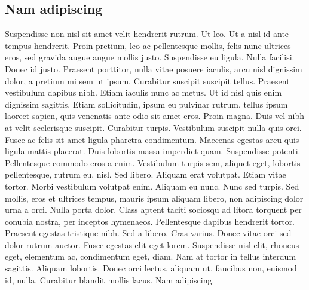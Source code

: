  \subsection{Nam adipiscing}
 Suspendisse non nisl sit amet velit hendrerit rutrum. Ut leo. Ut a nisl id ante tempus hendrerit. Proin pretium, leo ac pellentesque mollis, felis nunc ultrices eros, sed gravida augue augue mollis justo. Suspendisse eu ligula. Nulla facilisi. Donec id justo. Praesent porttitor, nulla vitae posuere iaculis, arcu nisl dignissim dolor, a pretium mi sem ut ipsum. Curabitur suscipit suscipit tellus. Praesent vestibulum dapibus nibh. Etiam iaculis nunc ac metus. Ut id nisl quis enim dignissim sagittis. Etiam sollicitudin, ipsum eu pulvinar rutrum, tellus ipsum laoreet sapien, quis venenatis ante odio sit amet eros. Proin magna. Duis vel nibh at velit scelerisque suscipit. Curabitur turpis. Vestibulum suscipit nulla quis orci. Fusce ac felis sit amet ligula pharetra condimentum. Maecenas egestas arcu quis ligula mattis placerat. Duis lobortis massa imperdiet quam. Suspendisse potenti. Pellentesque commodo eros a enim. Vestibulum turpis sem, aliquet eget, lobortis pellentesque, rutrum eu, nisl. Sed libero. Aliquam erat volutpat. Etiam vitae tortor. Morbi vestibulum volutpat enim. Aliquam eu nunc. Nunc sed turpis. Sed mollis, eros et ultrices tempus, mauris ipsum aliquam libero, non adipiscing dolor urna a orci. Nulla porta dolor. Class aptent taciti sociosqu ad litora torquent per conubia nostra, per inceptos hymenaeos. Pellentesque dapibus hendrerit tortor. Praesent egestas tristique nibh. Sed a libero. Cras varius. Donec vitae orci sed dolor rutrum auctor. Fusce egestas elit eget lorem. Suspendisse nisl elit, rhoncus eget, elementum ac, condimentum eget, diam. Nam at tortor in tellus interdum sagittis. Aliquam lobortis. Donec orci lectus, aliquam ut, faucibus non, euismod id, nulla. Curabitur blandit mollis lacus. Nam adipiscing.

